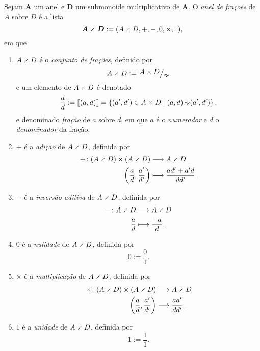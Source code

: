 \begin{definition}
Sejam $\bm A$ um anel e $\bm D$ um submonoide multiplicativo de $\bm A$. O \emph{anel de frações} de $A$ sobre $D$ é a lista
	\begin{equation*}
	\bm{A \olddiv D} := (A \olddiv D,+,-,0,\times,1),
	\end{equation*}
em que
\begin{enumerate}
	\item $A \olddiv D$ é o \emph{conjunto de frações}, definido por
		\begin{equation*}
		A \olddiv D := \quo{A \times D}{\simfra}
		\end{equation*}
e um elemento de $A \olddiv D$ é denotado
		\begin{equation*}
		\frac{a}{d} := \cla{(a,d)} = \set{(a',d') \in A \times D}{(a,d) \simfra (a',d')},
		\end{equation*}
e denominado \emph{fração} de $a$ sobre $d$, em que $a$ é o \emph{numerador} e $d$ o \emph{denominador} da fração.
	\item $+$ é a \emph{adição} de $A \olddiv D$, definida por
		\begin{align*}
		\func{+}{(A \olddiv D) \times (A \olddiv D)}{A \olddiv D}{\left( \frac{a}{d}, \frac{a'}{d'} \right)}{\frac{ad'+a'd}{dd'}}.
		\end{align*}
	\item $-$ é a \emph{inversão aditiva} de $A \olddiv D$, definida por
		\begin{align*}
		\func{-}{A \olddiv D}{A \olddiv D}{\frac{a}{d}}{\frac{-a}{d}}.
		\end{align*}
	\item $0$ é a \emph{nulidade} de $A \olddiv D$, definida por
		\begin{equation*}
		0 := \frac{0}{1}.
		\end{equation*}
	\item $\times$ é a \emph{multiplicação} de $A \olddiv D$, definida por
		\begin{align*}
		\func{\times}{(A \olddiv D) \times (A \olddiv D)}{A \olddiv D}{\left( \frac{a}{d}, \frac{a'}{d'} \right)}{\frac{aa'}{dd'}}.
		\end{align*}
	\item $1$ é a \emph{unidade} de $A \olddiv D$, definida por
		\begin{equation*}
		1 := \frac{1}{1}.
		\end{equation*}
\end{enumerate}
\end{definition}

